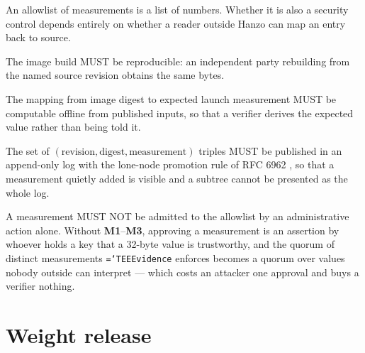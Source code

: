 \documentclass[11pt,a4paper]{article}
\newcommand{\code}[1]{\texttt{\hyphenchar\font=`\-\relax #1}}
\newcommand{\req}[1]{\textbf{#1}}
\begin{document}
An allowlist of measurements is a list of numbers. Whether it is also a security
control depends entirely on whether a reader outside Hanzo can map an entry back to
source.

\begin{description}[leftmargin=1.6em]
\item[\req{M1}] The image build MUST be reproducible: an independent party
rebuilding from the named source revision obtains the same bytes.

\item[\req{M2}] The mapping from image digest to expected launch measurement MUST
be computable offline from published inputs, so that a verifier derives the
expected value rather than being told it.

\item[\req{M3}] The set of $(\text{revision}, \text{digest}, \text{measurement})$
triples MUST be published in an append-only log with the lone-node promotion rule of
RFC 6962 \cite{rfc6962}, so that a measurement quietly added is visible and a
subtree cannot be presented as the whole log.

\item[\req{M4}] A measurement MUST NOT be admitted to the allowlist by an
administrative action alone. Without \req{M1}--\req{M3}, approving a measurement is
an assertion by whoever holds a key that a 32-byte value is trustworthy, and the
quorum of distinct measurements \code{TEEEvidence} enforces becomes a quorum over
values nobody outside can interpret --- which costs an attacker one approval and
buys a verifier nothing.
\end{description}

\section{Weight release}
\label{sec:release}
\end{document}
